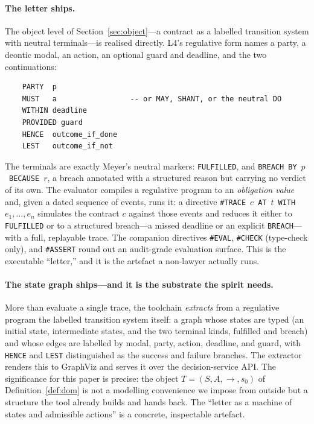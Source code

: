 \paragraph{The letter ships.} The object level of Section~\ref{sec:object}---a contract as
a labelled transition system with neutral terminals---is realised directly. L4's regulative
form names a party, a deontic modal, an action, an optional guard and deadline, and the two
continuations:
\begin{verbatim}
    PARTY  p
    MUST   a                 -- or MAY, SHANT, or the neutral DO
    WITHIN deadline
    PROVIDED guard
    HENCE  outcome_if_done
    LEST   outcome_if_not
\end{verbatim}
The terminals are exactly Meyer's neutral markers: \texttt{FULFILLED}, and
\texttt{BREACH BY}~$p$~\texttt{BECAUSE}~$r$, a breach annotated with a structured reason but
carrying no verdict of its own. The evaluator compiles a regulative program to an
\emph{obligation value} and, given a dated sequence of events, runs it: a directive
\texttt{\#TRACE}~$c$~\texttt{AT}~$t$~\texttt{WITH}~$e_1,\dots,e_n$ simulates the contract
$c$ against those events and reduces it either to \texttt{FULFILLED} or to a structured
breach---a missed deadline or an explicit \texttt{BREACH}---with a full, replayable trace.
The companion directives \texttt{\#EVAL}, \texttt{\#CHECK} (type-check only), and
\texttt{\#ASSERT} round out an audit-grade evaluation surface. This is the executable
``letter,'' and it is the artefact a non-lawyer actually runs.

\paragraph{The state graph ships---and it is the substrate the spirit needs.} More than
evaluate a single trace, the toolchain \emph{extracts} from a regulative program the
labelled transition system itself: a graph whose states are typed (an initial state,
intermediate states, and the two terminal kinds, fulfilled and breach) and whose edges are
labelled by modal, party, action, deadline, and guard, with \texttt{HENCE} and \texttt{LEST}
distinguished as the success and failure branches. The extractor renders this to GraphViz
and serves it over the decision-service API. The significance for this paper is precise:
the object $T=(S,A,{\to},s_0)$ of Definition~\ref{def:dom} is not a modelling convenience we
impose from outside but a structure the tool already builds and hands back. The ``letter as
a machine of states and admissible actions'' is a concrete, inspectable artefact.

